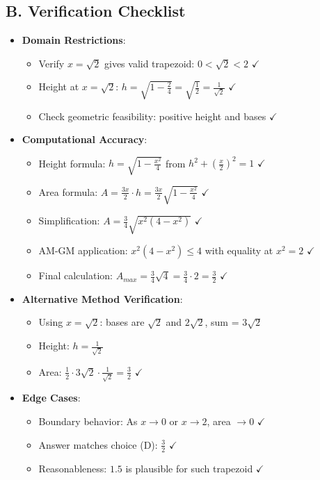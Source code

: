 \documentclass[12pt]{article}
\begin{document}
\begin{verificationbox}
\subsection*{B. Verification Checklist}
\begin{itemize}[leftmargin=*]
    \item \textbf{Domain Restrictions}: 
    \begin{itemize}
        \item[$\checkmark$] Verify $x = \sqrt{2}$ gives valid trapezoid: $0 < \sqrt{2} < 2$ $\checkmark$
        \item[$\checkmark$] Height at $x = \sqrt{2}$: $h = \sqrt{1 - \frac{2}{4}} = \sqrt{\frac{1}{2}} = \frac{1}{\sqrt{2}}$ $\checkmark$
        \item[$\checkmark$] Check geometric feasibility: positive height and bases $\checkmark$
    \end{itemize}
    \item \textbf{Computational Accuracy}: 
    \begin{itemize}
        \item[$\checkmark$] Height formula: $h = \sqrt{1 - \frac{x^2}{4}}$ from $h^2 + \left(\frac{x}{2}\right)^2 = 1$ $\checkmark$
        \item[$\checkmark$] Area formula: $A = \frac{3x}{2} \cdot h = \frac{3x}{2}\sqrt{1-\frac{x^2}{4}}$ $\checkmark$
        \item[$\checkmark$] Simplification: $A = \frac{3}{4}\sqrt{x^2(4-x^2)}$ $\checkmark$
        \item[$\checkmark$] AM-GM application: $x^2(4-x^2) \leq 4$ with equality at $x^2 = 2$ $\checkmark$
        \item[$\checkmark$] Final calculation: $A_{max} = \frac{3}{4}\sqrt{4} = \frac{3}{4} \cdot 2 = \frac{3}{2}$ $\checkmark$
    \end{itemize}
    \item \textbf{Alternative Method Verification}:
    \begin{itemize}
        \item Using $x = \sqrt{2}$: bases are $\sqrt{2}$ and $2\sqrt{2}$, sum = $3\sqrt{2}$
        \item Height: $h = \frac{1}{\sqrt{2}}$
        \item Area: $\frac{1}{2} \cdot 3\sqrt{2} \cdot \frac{1}{\sqrt{2}} = \frac{3}{2}$ $\checkmark$
    \end{itemize}
    \item \textbf{Edge Cases}: 
    \begin{itemize}
        \item[$\checkmark$] Boundary behavior: As $x \to 0$ or $x \to 2$, area $\to 0$ $\checkmark$
        \item[$\checkmark$] Answer matches choice (D): $\frac{3}{2}$ $\checkmark$
        \item[$\checkmark$] Reasonableness: $1.5$ is plausible for such trapezoid $\checkmark$
    \end{itemize}
\end{itemize}
\end{verificationbox}
\end{document}
